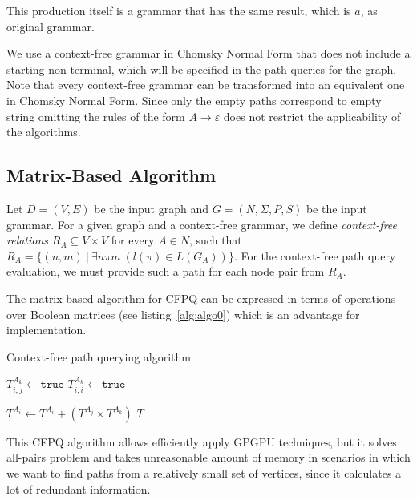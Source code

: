 This production itself is a grammar that has the same result, which is ${a}$, as original grammar.

We use a context-free grammar in Chomsky Normal Form that does not include a starting non-terminal, which will be specified in the path queries for the graph. Note that every context-free grammar can be transformed into an equivalent one in Chomsky Normal Form. Since only the empty paths correspond to empty string omitting the rules of the form \mbox{$A \rightarrow \varepsilon$} does not restrict the applicability of the algorithms.


\subsection{Matrix-Based Algorithm}

Let $D = (V, E)$ be the input graph and $G = (N, \Sigma, P, S)$ be the input grammar. For a given graph and a context-free grammar, we define \emph{context-free relations} \mbox{$R_A \subseteq V \times V$} for every \mbox{$A \in N$}, such that $R_A = \{(n,m)~|~\exists n \pi m~(l(\pi) \in L(G_A))\}$. For the context-free path query evaluation, we must provide such a path for each node pair from $R_A$.

The matrix-based algorithm for CFPQ can be expressed in terms of operations over Boolean matrices (see listing~\ref{alg:algo0}) which is an advantage for implementation.
{\footnotesize
\begin{algorithm}
\begin{algorithmic}[1]
\caption{Context-free path querying algorithm}
\label{alg:algo0}
          {$T^{A_k}_{i,j} \gets \texttt{true}$}
    \EndFor
            {$T^{A_k}_{i,i} \gets \texttt{true}$}
        \EndFor
    \EndFor

          { $T^{A_i} \gets T^{A_i} + (T^{A_j} \times T^{A_k})$ } 
        \EndFor
    \EndWhile
\State \Return $T$
\EndFunction
\end{algorithmic}
\end{algorithm}
}

This CFPQ algorithm allows efficiently apply GPGPU techniques, but it solves all-pairs problem and takes unreasonable amount of memory in scenarios in which we want to find paths from a relatively small set of vertices, since it calculates a lot of redundant information. 